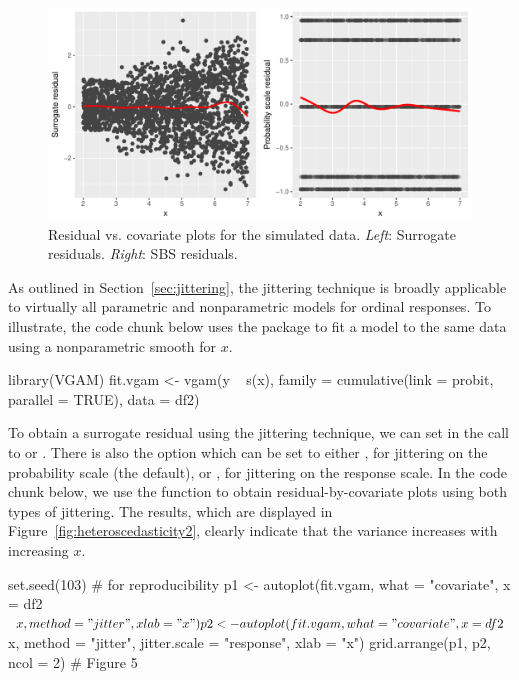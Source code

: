 \begin{figure}[!htbp]
  \centering
  \includegraphics[width=1\textwidth]{heteroscedasticity}
  \caption{Residual vs. covariate plots for the simulated data. \textit{Left}: Surrogate residuals. \textit{Right}: SBS residuals.}
  \label{fig:heteroscedasticity}
\end{figure}

As outlined in Section~\ref{sec:jittering}, the jittering technique is broadly applicable to virtually all parametric and nonparametric models for ordinal responses. To illustrate, the code chunk below uses the  package to fit a  model to the same data using a nonparametric smooth for $x$.
\begin{example}
library(VGAM)
fit.vgam <- vgam(y ~ s(x), family = cumulative(link = probit, parallel = TRUE),
                 data = df2)
\end{example}

To obtain a surrogate residual using the jittering technique, we can set  in the call to  or . There is also the option  which can be set to either , for jittering on the probability scale (the default), or , for jittering on the response scale. In the code chunk below, we use the  function to obtain residual-by-covariate plots using both types of jittering. The results, which are displayed in Figure~\ref{fig:heteroscedasticity2}, clearly indicate that the variance increases with increasing $x$.
\begin{example}
set.seed(103)  # for reproducibility
p1 <- autoplot(fit.vgam, what = "covariate", x = df2$x, method = "jitter",
               xlab = "x")
p2 <- autoplot(fit.vgam, what = "covariate", x = df2$x, method = "jitter",
               jitter.scale = "response", xlab = "x")
grid.arrange(p1, p2, ncol = 2)  # Figure 5
\end{example}

